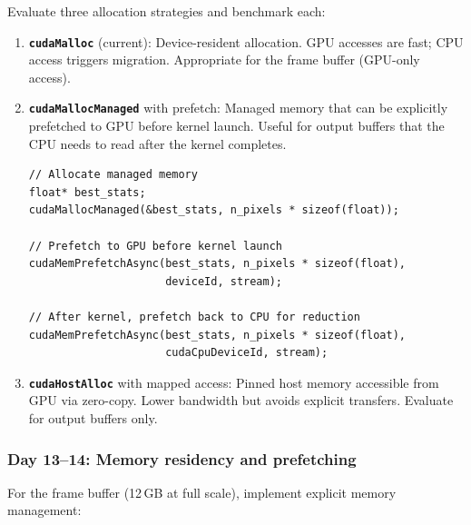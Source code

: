 \documentclass[11pt,letterpaper]{article}
\begin{document}
Evaluate three allocation strategies and benchmark each:

\begin{enumerate}[leftmargin=2em]
    \item \textbf{\texttt{cudaMalloc}} (current):
    Device-resident allocation. GPU accesses are fast; CPU access triggers
    migration. Appropriate for the frame buffer (GPU-only access).

    \item \textbf{\texttt{cudaMallocManaged}} with prefetch:
    Managed memory that can be explicitly prefetched to GPU before kernel
    launch. Useful for output buffers that the CPU needs to read after
    the kernel completes.

\begin{lstlisting}[style=cudastyle]
// Allocate managed memory
float* best_stats;
cudaMallocManaged(&best_stats, n_pixels * sizeof(float));

// Prefetch to GPU before kernel launch
cudaMemPrefetchAsync(best_stats, n_pixels * sizeof(float),
                     deviceId, stream);

// After kernel, prefetch back to CPU for reduction
cudaMemPrefetchAsync(best_stats, n_pixels * sizeof(float),
                     cudaCpuDeviceId, stream);
\end{lstlisting}

    \item \textbf{\texttt{cudaHostAlloc}} with mapped access:
    Pinned host memory accessible from GPU via zero-copy. Lower bandwidth
    but avoids explicit transfers. Evaluate for output buffers only.
\end{enumerate}

\subsubsection{Day 13--14: Memory residency and prefetching}

For the frame buffer (12\,GB at full scale), implement explicit memory
management:
\end{document}
